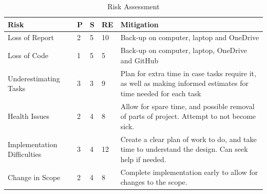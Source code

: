 \documentclass[12pt]{article}
\begin{document}
\begin{table}[ht]
    \renewcommand{\arraystretch}{1.3}
    \caption{Risk Assessment} %
    \centering %
    \begin{tabular}{|p{3cm} | p{0.4cm} | p{0.4cm} | p{0.6cm} | p{8cm}|} %
        \hline\hline %
        \textbf{Risk}               & \textbf{P} & \textbf{S} & \textbf{RE} & \textbf{Mitigation}                                                                                              \\ [0.5ex] %
        \hline %
        Loss of Report              & 2          & 5          & 10          & Back-up on computer, laptop and OneDrive                                                                         \\ \hline %
        Loss of Code                & 1          & 5          & 5           & Back-up on computer, laptop, OneDrive and GitHub                                                                 \\ \hline
        Underestimating Tasks       & 3          & 3          & 9           & Plan for extra time in case tasks require it, as well as making informed estimates for time needed for each task \\ \hline
        Health Issues               & 2          & 4          & 8           & Allow for spare time, and possible removal of parts of project. Attempt to not become sick.                      \\ \hline
        Implementation Difficulties & 3          & 4          & 12          & Create a clear plan of work to do, and take time to understand the design. Can seek help if needed.              \\ \hline
        Change in Scope             & 2          & 4          & 8           & Complete implementation early to allow for changes to the scope.
        \\ \hline %
    \end{tabular}
    \label{table:risk} %
\end{table}


\clearpage
\printbibliography
\end{document}
